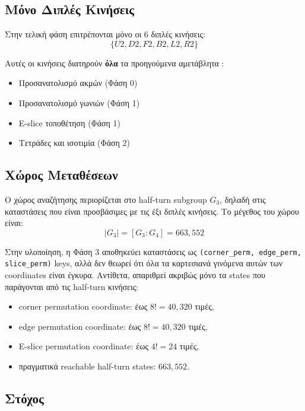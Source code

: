 \subsection{Μόνο Διπλές Κινήσεις}

Στην τελική φάση επιτρέπονται μόνο οι 6 διπλές κινήσεις:
\begin{equation}
    \{U2, D2, F2, B2, L2, R2\}
\end{equation}

Αυτές οι κινήσεις διατηρούν \textbf{όλα} τα προηγούμενα αμετάβλητα \cite{scherphuis_thistlethwaite_summary,kociemba_twophase_details}:
\begin{itemize}
    \item Προσανατολισμό ακμών (Φάση 0)
    \item Προσανατολισμό γωνιών (Φάση 1)
    \item E-slice τοποθέτηση (Φάση 1)
    \item Τετράδες και ισοτιμία (Φάση 2)
\end{itemize}

\subsection{Χώρος Μεταθέσεων}

Ο χώρος αναζήτησης περιορίζεται στο half-turn subgroup $G_3$, δηλαδή στις
καταστάσεις που είναι προσβάσιμες με τις έξι διπλές κινήσεις. Το μέγεθος του
χώρου είναι:
\begin{equation}
    |G_3| = [G_3:G_4] = 663{,}552
\end{equation}

Στην υλοποίηση, η Φάση 3 αποθηκεύει καταστάσεις ως
\texttt{(corner\_perm, edge\_perm, slice\_perm)} keys, αλλά δεν θεωρεί ότι όλα
τα καρτεσιανά γινόμενα αυτών των coordinates είναι έγκυρα. Αντίθετα,
απαριθμεί ακριβώς μόνο τα states που παράγονται από τις half-turn κινήσεις:
\begin{itemize}
    \item corner permutation coordinate: έως $8! = 40{,}320$ τιμές,
    \item edge permutation coordinate: έως $8! = 40{,}320$ τιμές,
    \item E-slice permutation coordinate: έως $4! = 24$ τιμές,
    \item πραγματικά reachable half-turn states: $663{,}552$.
\end{itemize}

\subsection{Στόχος}

